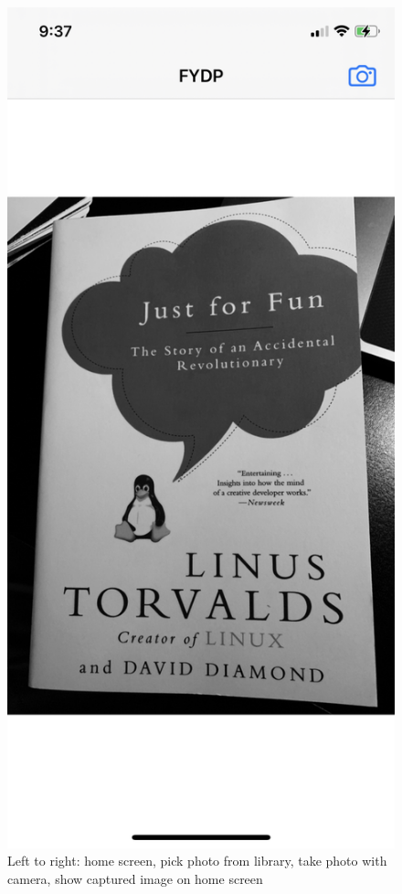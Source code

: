 \documentclass[a4paper,11pt]{article}
\begin{document}
\begin{figure}[H]
\includegraphics[scale=0.1]{img/test_app/testapp_bookcover.jpeg}
\caption{Left to right: home screen, pick photo from library, take photo with camera, show captured image on home screen}
\label{fig:test_app_screenshots}
\end{figure}
\end{document}
